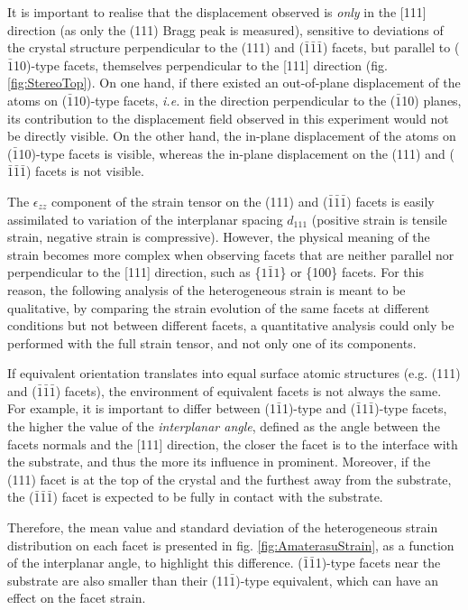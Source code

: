 It is important to realise that the displacement observed is \textit{only} in the [111] direction (as only the (111) Bragg peak is measured), sensitive to deviations of the crystal structure perpendicular to the (111) and ($\bar{1}\bar{1}\bar{1}$) facets, but parallel to ($\bar{1}$10)-type facets, themselves perpendicular to the [111] direction (fig. \ref{fig:StereoTop}).
On one hand, if there existed an out-of-plane displacement of the atoms on ($\bar{1}$10)-type facets, \textit{i.e.} in the direction perpendicular to the ($\bar{1}$10) planes, its contribution to the displacement field observed in this experiment would not be directly visible.
On the other hand, the in-plane displacement of the atoms on ($\bar{1}$10)-type facets is visible, whereas the in-plane displacement on the (111) and ($\bar{1}\bar{1}\bar{1}$) facets is not visible.

The $\epsilon_{zz}$ component of the strain tensor on the (111) and ($\bar{1}\bar{1}\bar{1}$) facets is easily assimilated to variation of the interplanar spacing $d_{111}$ (positive strain is tensile strain, negative strain is compressive).
However, the physical meaning of the strain becomes more complex when observing facets that are neither parallel nor perpendicular to the [111] direction, such as \{$1\bar{1}1$\} or \{100\} facets.
For this reason, the following analysis of the heterogeneous strain is meant to be qualitative, by comparing the strain evolution of the same facets at different conditions but not between different facets, a quantitative analysis could only be performed with the full strain tensor, and not only one of its components.

If equivalent orientation translates into equal surface atomic structures (e.g. (111) and ($\bar{1}\bar{1}\bar{1}$) facets), the environment of equivalent facets is not always the same.
For example, it is important to differ between (1$\bar{1}$1)-type and ($\bar{1}$1$\bar{1}$)-type facets, the higher the value of the \textit{interplanar angle}, defined as the angle between the facets normals and the [111] direction, the closer the facet is to the interface with the substrate, and thus the more its influence in prominent.
Moreover, if the (111) facet is at the top of the crystal and the furthest away from the substrate, the ($\bar{1}\bar{1}\bar{1}$) facet is expected to be fully in contact with the substrate.

Therefore, the mean value and standard deviation of the heterogeneous strain distribution on each facet is presented in fig. \ref{fig:AmaterasuStrain}, as a function of the interplanar angle, to highlight this difference.
($\bar{1}\bar{1}$1)-type facets near the substrate are also smaller than their (11$\bar{1}$)-type equivalent, which can have an effect on the facet strain.

